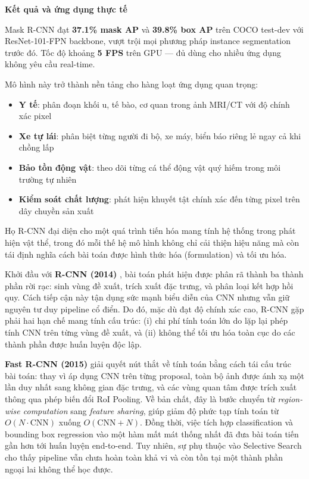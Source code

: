 \begin{mdframed}[style=infobox]
\textbf{Kết quả và ứng dụng thực tế}

Mask R-CNN đạt \textbf{37.1\% mask AP} và \textbf{39.8\% box AP} trên COCO test-dev với ResNet-101-FPN backbone, vượt trội mọi phương pháp instance segmentation trước đó. Tốc độ khoảng \textbf{5 FPS} trên GPU --- đủ dùng cho nhiều ứng dụng không yêu cầu real-time.

Mô hình này trở thành nền tảng cho hàng loạt ứng dụng quan trọng:
\begin{itemize}
	\item \textbf{Y tế}: phân đoạn khối u, tế bào, cơ quan trong ảnh MRI/CT với độ chính xác pixel
	\item \textbf{Xe tự lái}: phân biệt từng người đi bộ, xe máy, biển báo riêng lẻ ngay cả khi chồng lấp
	\item \textbf{Bảo tồn động vật}: theo dõi từng cá thể động vật quý hiếm trong môi trường tự nhiên
	\item \textbf{Kiểm soát chất lượng}: phát hiện khuyết tật chính xác đến từng pixel trên dây chuyền sản xuất
\end{itemize}
\end{mdframed}


Họ R-CNN đại diện cho một quá trình tiến hóa mang tính hệ thống trong phát hiện vật thể, trong đó mỗi thế hệ mô hình không chỉ cải thiện hiệu năng mà còn tái định nghĩa cách bài toán được hình thức hóa (formulation) và tối ưu hóa.

Khởi đầu với \textbf{R-CNN (2014)} \cite{Girshick2014}, bài toán phát hiện được phân rã thành ba thành phần rời rạc: sinh vùng đề xuất, trích xuất đặc trưng, và phân loại kết hợp hồi quy. Cách tiếp cận này tận dụng sức mạnh biểu diễn của CNN nhưng vẫn giữ nguyên tư duy pipeline cổ điển. Do đó, mặc dù đạt độ chính xác cao, R-CNN gặp phải hai hạn chế mang tính cấu trúc: (i) chi phí tính toán lớn do lặp lại phép tính CNN trên từng vùng đề xuất, và (ii) không thể tối ưu hóa toàn cục do các thành phần được huấn luyện độc lập.

\textbf{Fast R-CNN (2015)} \cite{Girshick2015} giải quyết nút thắt về tính toán bằng cách tái cấu trúc bài toán: thay vì áp dụng CNN trên từng proposal, toàn bộ ảnh được ánh xạ một lần duy nhất sang không gian đặc trưng, và các vùng quan tâm được trích xuất thông qua phép biến đổi RoI Pooling. Về bản chất, đây là bước chuyển từ \textit{region-wise computation} sang \textit{feature sharing}, giúp giảm độ phức tạp tính toán từ $O(N \cdot \text{CNN})$ xuống $O(\text{CNN} + N)$. Đồng thời, việc tích hợp classification và bounding box regression vào một hàm mất mát thống nhất đã đưa bài toán tiến gần hơn tới huấn luyện end-to-end. Tuy nhiên, sự phụ thuộc vào Selective Search cho thấy pipeline vẫn chưa hoàn toàn khả vi và còn tồn tại một thành phần ngoại lai không thể học được.


